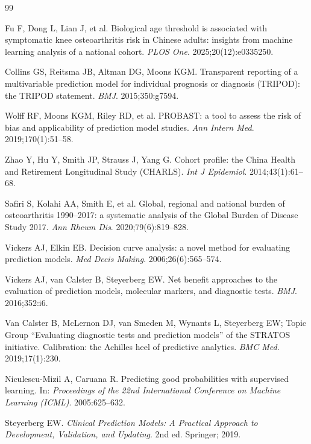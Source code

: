 \documentclass[11pt,a4paper]{article}
\begin{document}
\begin{thebibliography}{99}

 Fu F, Dong L, Lian J, et al. Biological age threshold is associated with symptomatic knee osteoarthritis risk in Chinese adults: insights from machine learning analysis of a national cohort. \textit{PLOS One}. 2025;20(12):e0335250.

 Collins GS, Reitsma JB, Altman DG, Moons KGM. Transparent reporting of a multivariable prediction model for individual prognosis or diagnosis (TRIPOD): the TRIPOD statement. \textit{BMJ}. 2015;350:g7594.

 Wolff RF, Moons KGM, Riley RD, et al. PROBAST: a tool to assess the risk of bias and applicability of prediction model studies. \textit{Ann Intern Med}. 2019;170(1):51--58.

 Zhao Y, Hu Y, Smith JP, Strauss J, Yang G. Cohort profile: the China Health and Retirement Longitudinal Study (CHARLS). \textit{Int J Epidemiol}. 2014;43(1):61--68.

 Safiri S, Kolahi AA, Smith E, et al. Global, regional and national burden of osteoarthritis 1990--2017: a systematic analysis of the Global Burden of Disease Study 2017. \textit{Ann Rheum Dis}. 2020;79(6):819--828.

 Vickers AJ, Elkin EB. Decision curve analysis: a novel method for evaluating prediction models. \textit{Med Decis Making}. 2006;26(6):565--574.

 Vickers AJ, van Calster B, Steyerberg EW. Net benefit approaches to the evaluation of prediction models, molecular markers, and diagnostic tests. \textit{BMJ}. 2016;352:i6.

 Van Calster B, McLernon DJ, van Smeden M, Wynants L, Steyerberg EW; Topic Group ``Evaluating diagnostic tests and prediction models'' of the STRATOS initiative. Calibration: the Achilles heel of predictive analytics. \textit{BMC Med}. 2019;17(1):230.

 Niculescu-Mizil A, Caruana R. Predicting good probabilities with supervised learning. In: \textit{Proceedings of the 22nd International Conference on Machine Learning (ICML)}. 2005:625--632.

 Steyerberg EW. \textit{Clinical Prediction Models: A Practical Approach to Development, Validation, and Updating}. 2nd ed. Springer; 2019.


\end{thebibliography}
\end{document}
